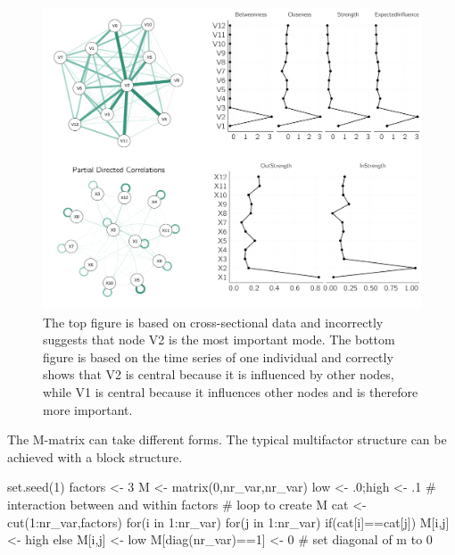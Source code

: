 \documentclass[
  a4paper,
  DIV=11,
  numbers=noendperiod,
  oneside]{scrreprt}
\newenvironment{Shaded}{\begin{snugshade}}{\end{snugshade}}
\newcommand{\CommentTok}[1]{\textcolor[rgb]{0.37,0.37,0.37}{#1}}
\newcommand{\ControlFlowTok}[1]{\textcolor[rgb]{0.00,0.23,0.31}{#1}}
\newcommand{\DecValTok}[1]{\textcolor[rgb]{0.68,0.00,0.00}{#1}}
\newcommand{\FunctionTok}[1]{\textcolor[rgb]{0.28,0.35,0.67}{#1}}
\newcommand{\NormalTok}[1]{\textcolor[rgb]{0.00,0.23,0.31}{#1}}
\newcommand{\OtherTok}[1]{\textcolor[rgb]{0.00,0.23,0.31}{#1}}
\newcommand{\SpecialCharTok}[1]{\textcolor[rgb]{0.37,0.37,0.37}{#1}}
\begin{document}
\begin{figure}

{\centering \includegraphics{media/ch6/fig-ch6-img16-old-85.png}

}

\caption{\label{fig-ch6-img16-old-85}The top figure is based on
cross-sectional data and incorrectly suggests that node V2 is the most
important mode. The bottom figure is based on the time series of one
individual and correctly shows that V2 is central because it is
influenced by other nodes, while V1 is central because it influences
other nodes and is therefore more important.}

\end{figure}

The M-matrix can take different forms. The typical multifactor structure
can be achieved with a block structure.

\begin{Shaded}
\begin{Highlighting}[]
\FunctionTok{set.seed}\NormalTok{(}\DecValTok{1}\NormalTok{)}
\NormalTok{factors }\OtherTok{\textless{}{-}} \DecValTok{3}
\NormalTok{M }\OtherTok{\textless{}{-}} \FunctionTok{matrix}\NormalTok{(}\DecValTok{0}\NormalTok{,nr\_var,nr\_var)}
\NormalTok{low }\OtherTok{\textless{}{-}}\NormalTok{ .}\DecValTok{0}\NormalTok{;high }\OtherTok{\textless{}{-}}\NormalTok{ .}\DecValTok{1} \CommentTok{\# interaction between and within factors}
\CommentTok{\# loop to create M}
\NormalTok{cat }\OtherTok{\textless{}{-}} \FunctionTok{cut}\NormalTok{(}\DecValTok{1}\SpecialCharTok{:}\NormalTok{nr\_var,factors)}
\ControlFlowTok{for}\NormalTok{(i }\ControlFlowTok{in} \DecValTok{1}\SpecialCharTok{:}\NormalTok{nr\_var)}
  \ControlFlowTok{for}\NormalTok{(j }\ControlFlowTok{in} \DecValTok{1}\SpecialCharTok{:}\NormalTok{nr\_var)}
    \ControlFlowTok{if}\NormalTok{(cat[i]}\SpecialCharTok{==}\NormalTok{cat[j]) M[i,j] }\OtherTok{\textless{}{-}}\NormalTok{ high }\ControlFlowTok{else}\NormalTok{ M[i,j] }\OtherTok{\textless{}{-}}\NormalTok{ low}
\NormalTok{M[}\FunctionTok{diag}\NormalTok{(nr\_var)}\SpecialCharTok{==}\DecValTok{1}\NormalTok{] }\OtherTok{\textless{}{-}} \DecValTok{0} \CommentTok{\# set diagonal of m to 0}
\end{Highlighting}
\end{Shaded}
\end{document}
